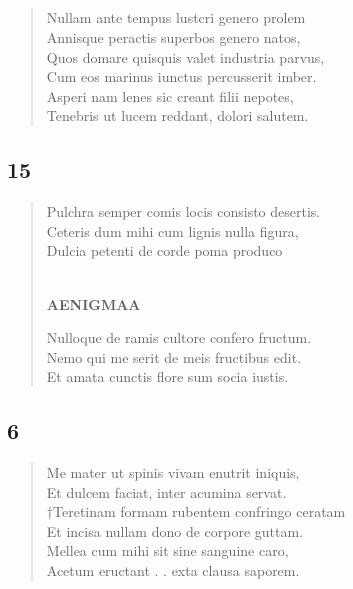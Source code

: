 \documentclass[11pt, a4paper]{report}
\begin{document}
            \subsection*{}
      \begin{verse}
      Nullam ante tempus lustcri genero prolem \\ Annisque peractis superbos genero natos, \\ Quos domare quisquis valet industria parvus, \\ Cum eos marinus iunctus percusserit imber. \\ Asperi nam lenes sic creant filii nepotes, \\ Tenebris ut lucem reddant, dolori salutem. \\ 
      \end{verse}
  
            \subsection*{15}
      \begin{verse}
      Pulchra semper comis locis consisto desertis. \\ Ceteris dum mihi cum lignis nulla figura, \\ Dulcia petenti de corde poma produco \\ 
        ﻿\pagebreak 
    \begin{center} \textbf{AENIGMAA} \end{center} \marginpar{[356]} Nulloque de ramis cultore confero fructum. \\ Nemo qui me serit de meis fructibus edit. \\ Et amata cunctis flore sum socia iustis. \\ 
      \end{verse}
  
            \subsection*{6}
      \begin{verse}
      Me mater ut spinis vivam enutrit iniquis, \\ Et dulcem faciat, inter acumina servat. \\ †Teretinam formam rubentem confringo ceratam \\ Et incisa nullam dono de corpore guttam. \\ Mellea cum mihi sit sine sanguine caro, \\ Acetum eructant . . exta clausa saporem. \\ 
      \end{verse}
  
\end{document}

